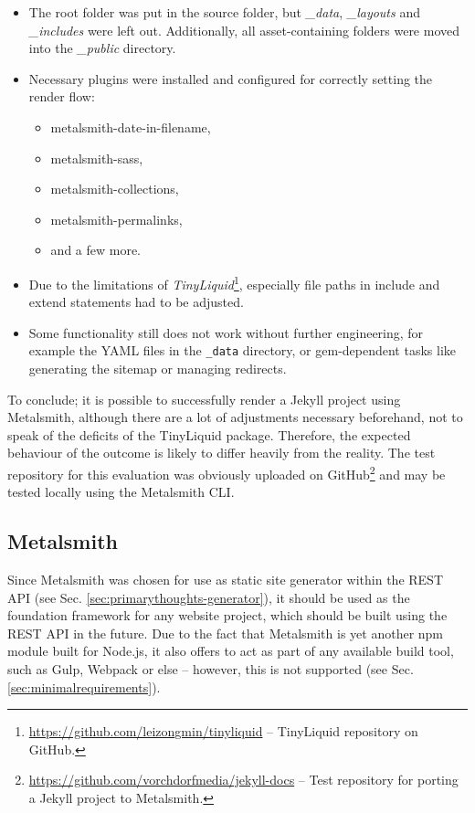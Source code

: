 \begin{itemize}
  \item The root folder was put in the source folder, but \emph{\_data}, \emph{\_layouts} and \emph{\_includes} were left out. Additionally, all asset-containing folders were moved into the \emph{\_public} directory.
  \item Necessary plugins were installed and configured for correctly setting the render flow:
  \begin{itemize}
    \item metalsmith-date-in-filename,
    \item metalsmith-sass,
    \item metalsmith-collections,
    \item metalsmith-permalinks,
    \item and a few more.
  \end{itemize}
  \item Due to the limitations of \emph{TinyLiquid}\footnote{\url{https://github.com/leizongmin/tinyliquid} -- TinyLiquid repository on GitHub.}, especially file paths in include and extend statements had to be adjusted.
  \item Some functionality still does not work without further engineering, for example the YAML files in the \texttt{\_data} directory, or gem-dependent tasks like generating the sitemap or managing redirects.
\end{itemize}

To conclude; it is possible to successfully render a Jekyll project using Metalsmith, although there are a lot of adjustments necessary beforehand, not to speak of the deficits of the TinyLiquid package. Therefore, the expected behaviour of the outcome is likely to differ heavily from the reality. The test repository for this evaluation was obviously uploaded on GitHub\footnote{\url{https://github.com/vorchdorfmedia/jekyll-docs} -- Test repository for porting a Jekyll project to Metalsmith.} and may be tested locally using the Metalsmith CLI.

\subsection{Metalsmith}
Since Metalsmith was chosen for use as static site generator within the REST API (see Sec. \ref{sec:primarythoughts-generator}), it should be used as the foundation framework for any website project, which should be built using the REST API in the future. Due to the fact that Metalsmith is yet another npm module built for Node.js, it also offers to act as part of any available build tool, such as Gulp, Webpack or else -- however, this is not supported (see Sec. \ref{sec:minimalrequirements}).

